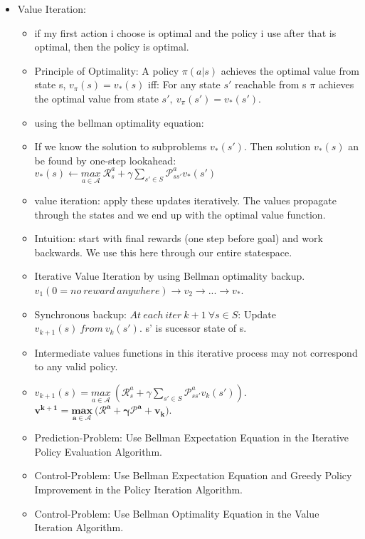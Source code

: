 \begin{itemize}[noitemsep,nolistsep]
\begin{itemize}
\begin{itemize}
		\end{itemize}
	\end{itemize}
	\item Value Iteration:
	\begin{itemize}[noitemsep,nolistsep]
		\item if my first action i choose is optimal and the policy i use after that is optimal, then the policy is optimal.
		\item Principle of Optimality: A policy $\pi(a|s)$ achieves the optimal value from state s, $v_\pi(s) = v_*(s)$ iff: For any state $s'$ reachable from s $\pi$ achieves the optimal value from state $s',\ v_\pi(s') = v_*(s')$.
		\item using the bellman optimality equation:
		\item If we know the solution to subproblems $v_*(s')$. Then solution $v_*(s)$ an be found by one-step lookahead: $v_*(s) \leftarrow \underset{a \in \mathcal{A}}{max}\ \mathcal{R}_s^a + \gamma \sum_{s' \in S} \mathcal{P}_{ss'}^a v_*(s')$
		\item value iteration: apply these updates iteratively. The values propagate through the states and we end up with the optimal value function.
		\item Intuition: start with final rewards (one step before goal) and work backwards. We use this here through our entire statespace.
		\item Iterative Value Iteration by using Bellman optimality backup. $v_1 (0 = no\ reward\ anywhere) \rightarrow v_2 \rightarrow ... \rightarrow v_*$.
		\item Synchronous backup: $At\ each\ iter\ k+1\ \forall s \in S$: Update $v_{k+1}(s)\ from\ v_k(s')$. s' is sucessor state of s.
		\item Intermediate values functions in this iterative process may not correspond to any valid policy.
		\item $v_{k+1}(s) = \underset{a \in \mathcal{A}}{max}\ (\mathcal{R}_s^a + \gamma \sum_{s' \in S}\mathcal{P}_{ss'}^a v_k(s'))$. $\mathbf{v^{k+1} = \underset{a \in \mathcal{A}}{max}\ (\mathcal{R}^a + \gamma \mathcal{P}^a + v_k})$.
		\item Prediction-Problem: Use Bellman Expectation Equation in the Iterative Policy Evaluation Algorithm.
		\item Control-Problem: Use Bellman Expectation Equation and Greedy Policy Improvement in the Policy Iteration Algorithm.
		\item Control-Problem: Use Bellman Optimality Equation in the Value Iteration Algorithm.

\end{itemize}
\end{itemize}
